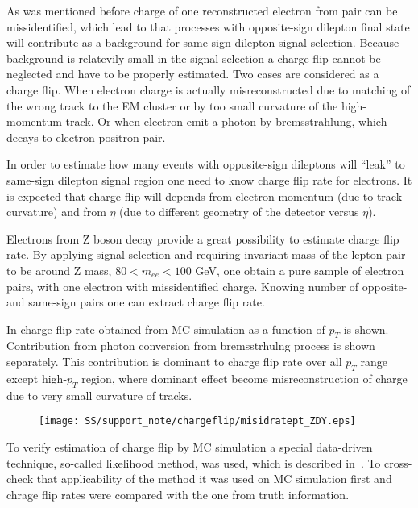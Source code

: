 As was mentioned before charge of one reconstructed electron from pair can be missidentified, which lead to that
processes with opposite-sign dilepton final state will contribute as a background for same-sign dilepton signal selection.
Because background is relatevily small in the signal selection a charge flip cannot be neglected and have to be properly estimated. Two cases are considered as a charge flip. When electron charge is actually misreconstructed due to matching of the wrong track to the EM cluster or by too small curvature of the high-momentum track. Or when electron emit a photon by bremsstrahlung, which decays to electron-positron pair. 

In order to estimate how many events with opposite-sign dileptons will ``leak'' to same-sign dilepton signal region one
need to know charge flip rate for electrons. It is expected that charge flip will depends from electron momentum (due to track curvature) and from $\eta$ (due to different geometry of the detector versus $\eta$).

Electrons from Z boson decay provide a great possibility to estimate charge flip rate. By applying signal selection
and requiring invariant mass of the lepton pair to be around Z mass, $80 < m_{ee} < 100$ GeV, one obtain a pure
sample of electron pairs, with one electron with missidentified charge. Knowing number of opposite- and same-sign
pairs one can extract charge flip rate.

In  charge flip rate obtained from MC simulation as a function of $p_T$ is shown.
Contribution from photon conversion from bremsstrhulng process is shown separately. This contribution is dominant 
to charge flip rate over all $p_T$ range except high-$p_T$ region, where dominant effect become misreconstruction 
of charge due to very small curvature of tracks.


\begin{figure}
\begin{center}
 \texttt{[image: SS/support\_note/chargeflip/misidratept\_ZDY.eps]}
\caption{\toDo[caption]}
\label{fig:chargeFlip_structure}
\end{center}
\end{figure}

To verify estimation of charge flip by MC simulation a special data-driven technique, so-called likelihood method, was used, which is described in~\cite{same_sign_paper_7tev}. To cross-check that applicability of the method it was used on 
MC simulation first and chrage flip rates were compared with the one from truth information. 

